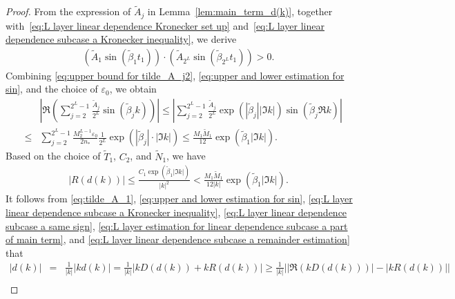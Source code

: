 \documentclass[11pt,reqno]{amsart}
\theoremstyle{definition}
\theoremstyle{remark}
\numberwithin{equation}{section}
\begin{document}
\begin{proof}
From the expression of $\tilde{A}_j$ in Lemma~\ref{lem:main_term_d(k)}, together with~\eqref{eq:L layer linear dependence Kronecker set up} and~\eqref{eq:L layer linear dependence subcase a Kronecker inequality}, we derive
\begin{equation}\label{eq:L layer linear dependence subcase a same sign}
    \begin{aligned}
      \left(\tilde{A}_1\sin\left(\tilde{\beta}_1t_1\right)\right)\cdot\left(\tilde{A}_{2^L}\sin\left(\tilde{\beta}_{2^L}t_1\right)\right)>0.~
    \end{aligned}
\end{equation}
Combining \eqref{eq:upper bound for tilde_A_j2}, \eqref{eq:upper and lower estimation for sin}, and the choice of $\varepsilon_0$, we obtain
\begin{eqnarray}\label{eq:L layer estimation for linear dependence subcase a part of main term}
      &&\left|\Re\left(\sum_{j=2}^{2^L-1}\frac{\tilde{A}_j}{2^L}\sin\left(\tilde{\beta}_j k\right)\right)\right| \leq\left| \sum_{j=2}^{2^L-1}\frac{\tilde{A}_j}{2^L}\exp{\left(\left|\tilde{\beta}_j\right||\Im k|\right)}\sin{\left(\tilde{\beta}_j \Re k\right)} \right| \nonumber\\
      &\leq& \sum_{j=2}^{2^L-1}\frac{M_2^{L-1}\varepsilon_0}{2n_{*}}\frac{1}{2^L}\exp{\left(\left|\tilde{\beta}_j\right|\cdot|\Im k|\right)} \leq \frac{M_1\widetilde{M}_1}{12}\exp{\left(\tilde{\beta}_1|\Im k|\right)}.~
\end{eqnarray}  
Based on the choice of $\widetilde{T}_1$, $C_2$, and $\widetilde{N}_1$, we have
\begin{equation}\label{eq:L layer linear dependence subcase a remainder estimation}
    \begin{aligned}
      \left|R(d(k))\right|\leq \frac{C_1\exp{\left(\tilde{\beta}_1|\Im k|\right)}}{|k|^2}<\frac{M_1\widetilde{M}_1}{12|k|}\exp{\left(\tilde{\beta}_1|\Im k|\right)}.~
    \end{aligned}
\end{equation}
It follows from \eqref{eq:tilde_A_1},  \eqref{eq:upper and lower estimation for sin}, \eqref{eq:L layer linear dependence subcase a Kronecker inequality},  \eqref{eq:L layer linear dependence subcase a same sign}, \eqref{eq:L layer estimation for linear dependence subcase a part of main term}, and \eqref{eq:L layer linear dependence subcase a remainder estimation} that
\begin{eqnarray}\label{eq:L layer dependence subcase a dk estimation on line}
      |d(k)|&=&\frac{1}{|k|}\left|kd(k)\right|=\frac{1}{|k|}\left|kD(d(k))+kR(d(k))\right|\geq \frac{1}{|k|}\left| \left|\Re\left(kD(d(k))\right)\right|-\left|kR(d(k))\right|\right| \nonumber\\

\end{eqnarray}
\end{proof}
\end{document}
